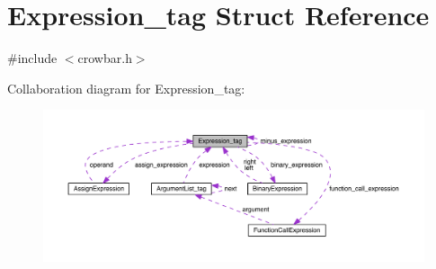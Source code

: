\hypertarget{struct_expression__tag}{}\section{Expression\+\_\+tag Struct Reference}
\label{struct_expression__tag}


{\ttfamily \#include $<$crowbar.\+h$>$}



Collaboration diagram for Expression\+\_\+tag\+:\nopagebreak
\begin{figure}[H]
\begin{center}
\leavevmode
\includegraphics[width=350pt]{struct_expression__tag__coll__graph}
\end{center}
\end{figure}
